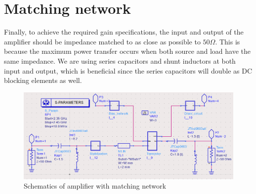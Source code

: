   \section{Matching network}
  Finally, to achieve the required gain specifications, the input and output of the amplifier should be impedance matched to as close as possible to $50 \Omega$. This is because the maximum power transfer occurs when both source and load have the same impedance. We are using series capacitors and shunt inductors at both input and output, which is beneficial since the series capacitors will double as DC blocking elements as well.

  \begin{figure}[h]
	  \centering
	  \includegraphics[width=\textwidth]{img/Matching_circuit}
	  \caption{Schematics of amplifier with matching network}
  	  \label{fig:Matchschem}
  \end{figure}

